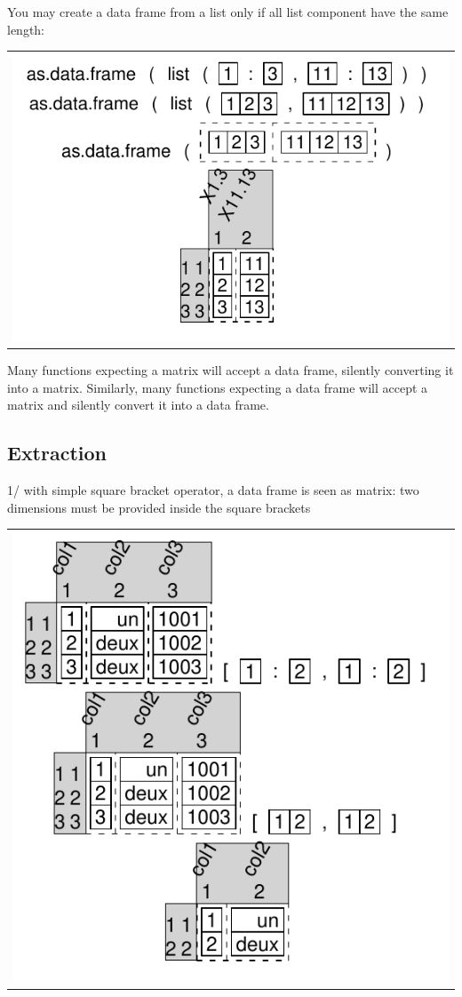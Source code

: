 \documentclass[pdflatex]{article}
\begin{document}
You may create a data frame from a list only if all list component have the
same length:

\begin{tabular}{c}
\includegraphics{dataframe_as_dataframe_from_list}
\end{tabular}

Many functions expecting a matrix will accept a data frame, silently converting
it into a matrix. Similarly, many functions expecting a data frame will accept
a matrix and silently convert it into a data frame.

\subsection{Extraction}

1/ with simple square bracket operator, a data frame is seen as matrix: two dimensions must be provided inside the square brackets

\begin{tabular}{c}
\includegraphics{dataframe_extracting.pdf}
\end{tabular}
\end{document}
